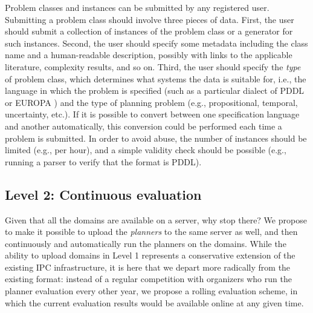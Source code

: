 Problem classes and instances can be submitted by any registered user. 
Submitting a problem class should involve three pieces of data. First,
the user should submit a collection of instances of the problem class or
a generator for such instances.  Second, the user should specify some
metadata including the class name and a human-readable description,
possibly with links to the applicable literature, complexity results, and
so on.  Third, the user should specify the \emph{type} of problem class,
which determines what systems the data is suitable for, i.e., the language
in which the problem is specified (such as a particular dialect of PDDL or
EUROPA ) and the type of planning problem (e.g., propositional,
temporal, uncertainty, etc.).  If it is possible to convert between one
specification language and another automatically, this conversion could be
performed each time a problem is submitted.
In order to avoid abuse, the number of instances should be limited (e.g.,
per hour), and a simple validity check should be possible (e.g., running a
parser to verify that the format is PDDL).



\subsection{Level 2: Continuous evaluation}

Given that all the domains are available on a server, why stop
there?  We propose to make it possible to upload the \emph{planners}
to the same server as well, and then continuously and automatically
run the planners on the domains.  While the ability to upload domains
in Level 1 represents a conservative extension of the existing IPC
infrastructure, it is here that we depart more radically from the
existing format: instead of a regular competition with organizers who
run the planner evaluation every other year, we propose a rolling
evaluation scheme, in which the current evaluation results would be
available online at any given time.

